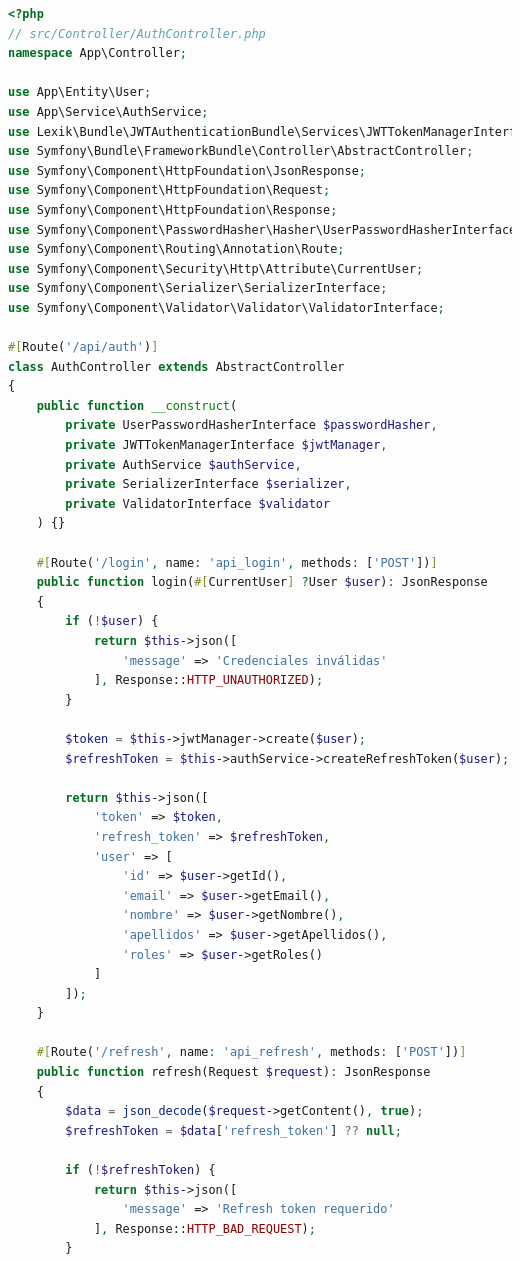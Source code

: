 \documentclass[12pt,a4paper,oneside]{report}
\begin{document}
\begin{lstlisting}[language=PHP]
<?php
// src/Controller/AuthController.php
namespace App\Controller;

use App\Entity\User;
use App\Service\AuthService;
use Lexik\Bundle\JWTAuthenticationBundle\Services\JWTTokenManagerInterface;
use Symfony\Bundle\FrameworkBundle\Controller\AbstractController;
use Symfony\Component\HttpFoundation\JsonResponse;
use Symfony\Component\HttpFoundation\Request;
use Symfony\Component\HttpFoundation\Response;
use Symfony\Component\PasswordHasher\Hasher\UserPasswordHasherInterface;
use Symfony\Component\Routing\Annotation\Route;
use Symfony\Component\Security\Http\Attribute\CurrentUser;
use Symfony\Component\Serializer\SerializerInterface;
use Symfony\Component\Validator\Validator\ValidatorInterface;

#[Route('/api/auth')]
class AuthController extends AbstractController
{
    public function __construct(
        private UserPasswordHasherInterface $passwordHasher,
        private JWTTokenManagerInterface $jwtManager,
        private AuthService $authService,
        private SerializerInterface $serializer,
        private ValidatorInterface $validator
    ) {}

    #[Route('/login', name: 'api_login', methods: ['POST'])]
    public function login(#[CurrentUser] ?User $user): JsonResponse
    {
        if (!$user) {
            return $this->json([
                'message' => 'Credenciales inválidas'
            ], Response::HTTP_UNAUTHORIZED);
        }

        $token = $this->jwtManager->create($user);
        $refreshToken = $this->authService->createRefreshToken($user);

        return $this->json([
            'token' => $token,
            'refresh_token' => $refreshToken,
            'user' => [
                'id' => $user->getId(),
                'email' => $user->getEmail(),
                'nombre' => $user->getNombre(),
                'apellidos' => $user->getApellidos(),
                'roles' => $user->getRoles()
            ]
        ]);
    }

    #[Route('/refresh', name: 'api_refresh', methods: ['POST'])]
    public function refresh(Request $request): JsonResponse
    {
        $data = json_decode($request->getContent(), true);
        $refreshToken = $data['refresh_token'] ?? null;

        if (!$refreshToken) {
            return $this->json([
                'message' => 'Refresh token requerido'
            ], Response::HTTP_BAD_REQUEST);
        }


\end{lstlisting}
\end{document}
